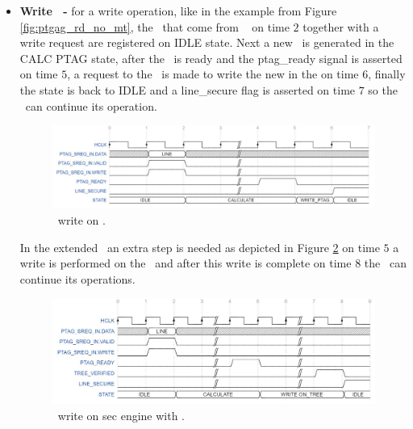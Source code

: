 \begin{itemize}
 \item{\textbf{Write \ptag~- }} for a write operation, like in the example from  Figure \ref{fig:ptgag_rd_no_mt}, the \sline~that  come from \handler~ on time $2$ together with a write request are registered on IDLE state.  Next a new \ptag~is generated in the CALC PTAG state, after the \ptag~is ready and the ptag\_ready signal is asserted on time $5$, a request to the \pmmu~is made  to write the new \ptag in the \ptagmem on time $6$, finally the state is back to IDLE  and a line\_secure flag is asserted on time $7$ so the \handler~can continue its operation. 
   \begin{figure}[!ht]
    \centering
    \includegraphics[width=\textwidth]{figures/others/ptag_write_sec_eng.JPG}
    \caption{\ptag~write  on \seceng.}
    \label{fig:se_pw_no_mt}
\end{figure}

In the extended \cshia~an extra step is needed as depicted in Figure \ref{fig:se_pw_mt} on time $5$ a write is performed on the \mt~and after this write is complete on time $8$ the \seceng~can continue its operations. 

  \begin{figure}[!ht]
    \centering
    \includegraphics[width=\textwidth]{figures/others/ptag_write_tree_sec_eng.JPG}
    \caption{\ptag~write  on sec engine with \mt.  }
    \label{fig:se_pw_mt}
\end{figure}
\end{itemize}







